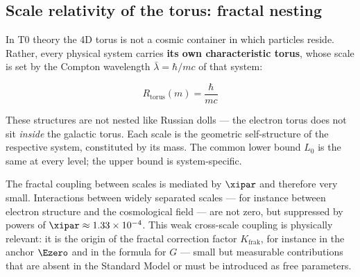 \subsection{Scale relativity of the torus: fractal nesting}

In T0 theory the 4D torus is not a cosmic container in which particles reside. Rather, every physical system carries \textbf{its own characteristic torus}, whose scale is set by the Compton wavelength $\bar\lambda = \hbar/mc$ of that system:

\begin{equation}
	R_{\text{torus}}(m) = \frac{\hbar}{mc}
\end{equation}

\begin{table}[h]
\centering
{}
\caption{System-specific torus scales — all sharing $L_0$ as common lower bound}
\end{table}

\begin{keypoint}
These structures are not nested like Russian dolls — the electron torus does not sit \textit{inside} the galactic torus. Each scale is the geometric self-structure of the respective system, constituted by its mass. The common lower bound $L_0$ is the same at every level; the upper bound is system-specific.

The fractal coupling between scales is mediated by $\xipar$ and therefore very small. Interactions between widely separated scales — for instance between electron structure and the cosmological field — are not zero, but suppressed by powers of $\xipar \approx 1{.}33 \times 10^{-4}$. This weak cross-scale coupling is physically relevant: it is the origin of the fractal correction factor $K_{\text{frak}}$, for instance in the anchor $\Ezero$ and in the formula for $G$ — small but measurable contributions that are absent in the Standard Model or must be introduced as free parameters.
\end{keypoint}

